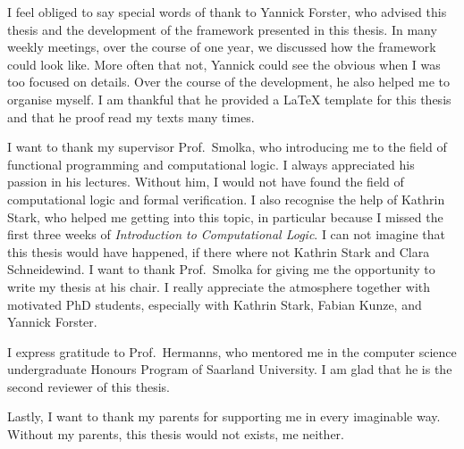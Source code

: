 I feel obliged to say special words of thank to Yannick Forster, who advised this thesis and the development of the framework presented in this
thesis.  In many weekly meetings, over the course of one year, we discussed how the framework could look like.  More often that not, Yannick could see
the obvious when I was too focused on details.  Over the course of the development, he also helped me to organise myself.  I am thankful that he
provided a {\LaTeX} template for this thesis and that he proof read my texts many times.

I want to thank my supervisor Prof.~Smolka, who introducing me to the field of functional programming and computational logic.  I always appreciated
his passion in his lectures.  Without him, I would not have found the field of computational logic and formal verification.  I also recognise the help
of Kathrin Stark, who helped me getting into this topic, in particular because I missed the first three weeks of \textit{Introduction to Computational
  Logic}.  I can not imagine that this thesis would have happened, if there where not Kathrin Stark and Clara Schneidewind.  I want to thank
Prof.~Smolka for giving me the opportunity to write my thesis at his chair.  I really appreciate the atmosphere together with motivated PhD students,
especially with Kathrin Stark, Fabian Kunze, and Yannick Forster.

I express gratitude to Prof.~Hermanns, who mentored me in the computer science undergraduate Honours Program of Saarland University.  I am glad that
he is the second reviewer of this thesis.

Lastly, I want to thank my parents for supporting me in every imaginable way.  Without my parents, this thesis would not exists, me neither.



